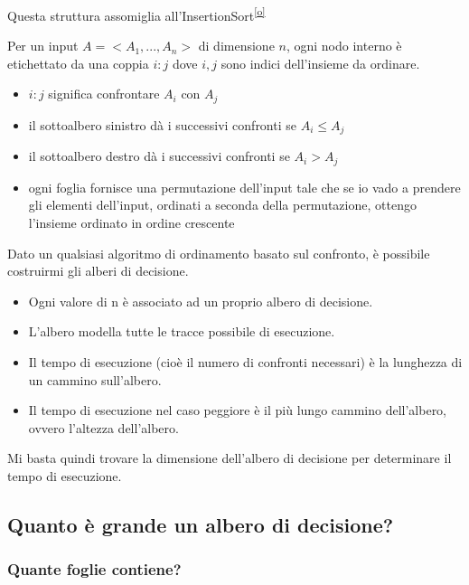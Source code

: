 \documentclass{article}
\providecommand{\tightlist}{%
  \setlength{\itemsep}{0pt}\setlength{\parskip}{0pt}}
\begin{document}
{{Questa struttura assomiglia
all'InsertionSort}\textsuperscript{\protect\hyperlink{cmnt15}{{[}o{]}}}

{}

{Per un input $A = <A_1,...,A_n>$ di dimensione $n$, ogni nodo interno è etichettato da una coppia $i:j$ dove $i,j$ sono indici dell'insieme da ordinare.}

\begin{itemize}
\tightlist
\item
  {$i:j$ significa confrontare $A_i$ con $A_j$}
\item
  {il sottoalbero sinistro dà i successivi confronti se $A_i \leq A_j$}
\item
  {il sottoalbero destro dà i successivi confronti se $A_i > A_j$}
\item
  {ogni foglia fornisce una permutazione dell'input tale che se io vado a prendere gli elementi dell'input, ordinati a seconda della permutazione, ottengo l'insieme ordinato in ordine crescente}
\end{itemize}

{Dato un qualsiasi algoritmo di ordinamento basato sul confronto, è
possibile costruirmi gli alberi di decisione.}

\begin{itemize}
\tightlist
\item
  {Ogni valore di n è associato ad un proprio albero di decisione.}
\item
  {L'albero modella tutte le tracce possibile di esecuzione.}
\item
  {Il tempo di esecuzione (cioè il numero di confronti necessari) è la
  lunghezza di un cammino sull'albero.}
\item
  {Il tempo di esecuzione nel caso peggiore è il più lungo cammino
  dell'albero, }{ovvero l'altezza dell'albero.}
\end{itemize}

{Mi basta quindi trovare la dimensione dell'albero di decisione per
determinare il tempo di esecuzione.}

\hypertarget{h.prflgx3s7s1g}{\subsection{\texorpdfstring{{Quanto è grande un albero di decisione?}}{Quanto è grande un albero di decisione?}}\label{h.prflgx3s7s1g}}

\hypertarget{h.cphw2k3mqktf}{\subsubsection{\texorpdfstring{{Quante foglie contiene?}}{Quante foglie contiene?}}\label{h.cphw2k3mqktf}}

}
\end{document}
